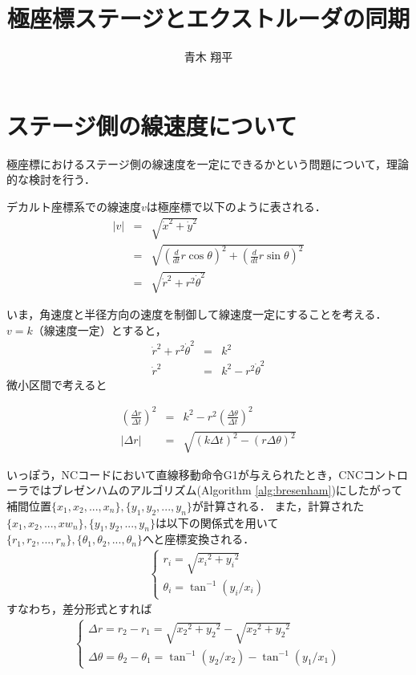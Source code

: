 \documentclass[twocolumn,oneside,a4paper]{article}
\title{極座標ステージとエクストルーダの同期}
\author{青木 翔平}
\begin{document}
\maketitle

\section{ステージ側の線速度について}
極座標におけるステージ側の線速度を一定にできるかという問題について，理論的な検討を行う．

デカルト座標系での線速度$v$は極座標で以下のように表される．
\begin{eqnarray}
|v| &=& \sqrt{\dot{x}^2 + \dot{y}^2} \nonumber \\
  &=& \sqrt{ \left(\frac{d}{dt} r \cos\theta \right) ^2 + \left(\frac{d}{dt}r \sin\theta\right) ^2} \nonumber \\
  &=& \sqrt{ \dot{r}^2+ r^2 \dot{\theta}^2 }
\end{eqnarray}    
    
いま，角速度と半径方向の速度を制御して線速度一定にすることを考える．
$v=k$（線速度一定）とすると，
\begin{eqnarray}\label{eq:vdef}
  \dot{r}^2+ r^2 \dot{\theta}^2 &=& k^2 \\
  \dot{r}^2 &=&  k^2 - r^2 \dot{\theta}^2
\end{eqnarray}
微小区間で考えると

\begin{eqnarray}\label{eq:deltar}
     \left( \frac{\Delta r}{\Delta t}\right)^2 &=&  k^2 - r^2 \left( \frac{\Delta \theta}{\Delta t}\right)^2 \nonumber \\
|\Delta r| &=& \sqrt{(k \Delta t)^2 - (r \Delta \theta)^2}
\end{eqnarray}

いっぽう，NCコードにおいて直線移動命令G1が与えられたとき，CNCコントローラではブレゼンハムのアルゴリズム(Algorithm \ref{alg:bresenham})にしたがって補間位置$\{x_1,x_2,...,x_n\},\{y_1,y_2,...,y_n\}$が計算される．
また，計算された$\{x_1,x_2,...,xw_n\},\{y_1,y_2,...,y_n\}$は以下の関係式を用いて$\{r_1,r_2,...,r_n\},\{\theta_1,\theta_2,...,\theta_n\}$へと座標変換される．　
\begin{eqnarray*}
\left\{
  \begin{array}{ll}
r_i = \sqrt{{x_i}^2+{y_i}^2} \\    
\theta_i = \tan^{-1} (y_i / x_i)
  \end{array}
  \right.
\end{eqnarray*}
すなわち，差分形式とすれば
\begin{eqnarray}\label{eq:diff}
\left\{
  \begin{array}{ll}
\Delta r = r_2-r_1 = \sqrt{{x_2}^2+{y_2}^2} - \sqrt{{x_2}^2+{y_2}^2} \\    
\Delta \theta = \theta_2-\theta_1 = \tan^{-1} (y_2 / x_2) - \tan^{-1} (y_1 / x_1)
  \end{array}
  \right.
\end{eqnarray}
\end{document}
